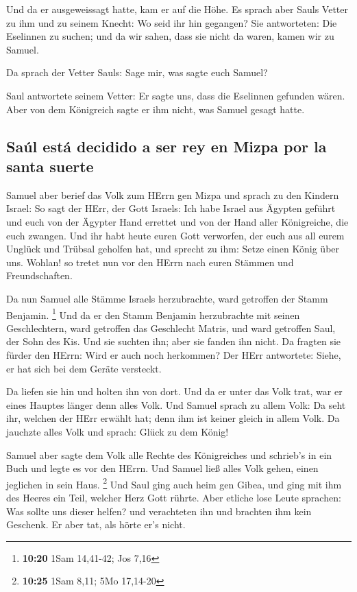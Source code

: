  Und da er ausgeweissagt hatte, kam er auf die Höhe.
 Es sprach aber Sauls Vetter zu ihm und zu seinem Knecht:
Wo seid ihr hin gegangen? Sie antworteten: Die Eselinnen zu suchen; und
da wir sahen, dass sie nicht da waren, kamen wir zu Samuel.

 Da sprach der Vetter Sauls: Sage mir, was sagte euch
Samuel?

 Saul antwortete seinem Vetter: Er sagte uns, dass die
Eselinnen gefunden wären. Aber von dem Königreich sagte er ihm nicht,
was Samuel gesagt hatte.

\hypertarget{sauxfal-estuxe1-decidido-a-ser-rey-en-mizpa-por-la-santa-suerte}{%
\subsection{Saúl está decidido a ser rey en Mizpa por la santa
suerte}\label{sauxfal-estuxe1-decidido-a-ser-rey-en-mizpa-por-la-santa-suerte}}

 Samuel aber berief das Volk zum HErrn gen Mizpa
 und sprach zu den Kindern Israel: So sagt der HErr, der
Gott Israels: Ich habe Israel aus Ägypten geführt und euch von der
Ägypter Hand errettet und von der Hand aller Königreiche, die euch
zwangen.  Und ihr habt heute euren Gott verworfen, der
euch aus all eurem Unglück und Trübsal geholfen hat, und sprecht zu ihm:
Setze einen König über uns. Wohlan! so tretet nun vor den HErrn nach
euren Stämmen und Freundschaften.

 Da nun Samuel alle Stämme Israels herzubrachte, ward
getroffen der Stamm Benjamin. \footnote{\textbf{10:20} 1Sam 14,41-42;
  Jos 7,16}  Und da er den Stamm Benjamin herzubrachte
mit seinen Geschlechtern, ward getroffen das Geschlecht Matris, und ward
getroffen Saul, der Sohn des Kis. Und sie suchten ihn; aber sie fanden
ihn nicht.  Da fragten sie fürder den HErrn: Wird er auch
noch herkommen? Der HErr antwortete: Siehe, er hat sich bei dem Geräte
versteckt.

 Da liefen sie hin und holten ihn von dort. Und da er
unter das Volk trat, war er eines Hauptes länger denn alles Volk.
 Und Samuel sprach zu allem Volk: Da seht ihr, welchen
der HErr erwählt hat; denn ihm ist keiner gleich in allem Volk. Da
jauchzte alles Volk und sprach: Glück zu dem König!

 Samuel aber sagte dem Volk alle Rechte des Königreiches
und schrieb's in ein Buch und legte es vor den HErrn. Und Samuel ließ
alles Volk gehen, einen jeglichen in sein Haus. \footnote{\textbf{10:25}
  1Sam 8,11; 5Mo 17,14-20}  Und Saul ging auch heim gen
Gibea, und ging mit ihm des Heeres ein Teil, welcher Herz Gott rührte.
 Aber etliche lose Leute sprachen: Was sollte uns dieser
helfen? und verachteten ihn und brachten ihm kein Geschenk. Er aber tat,
als hörte er's nicht.

